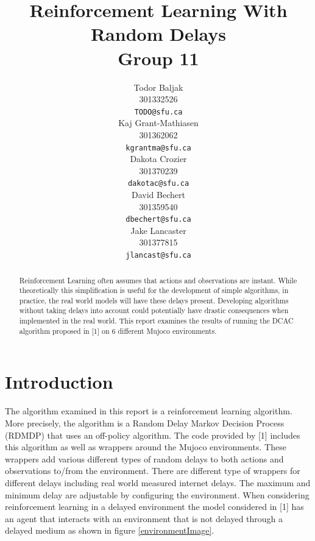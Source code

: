 \documentclass{article} %
\title{Reinforcement Learning With Random Delays\\Group 11}
\author{
   Todor Baljak\\
   301332526\\
   \texttt{TODO@sfu.ca}\\
\And
   Kaj Grant-Mathiasen\\
   301362062\\
   \texttt{kgrantma@sfu.ca}\\
\And
   Dakota Crozier\\
   301370239\\
   \texttt{dakotac@sfu.ca}\\
\AND
   David Bechert\\
   301359540\\
   \texttt{dbechert@sfu.ca}\\
\And
   Jake Lancaster\\
   301377815\\
   \texttt{jlancast@sfu.ca} \\
}
\begin{document}
\maketitle

\begin{abstract}
   Reinforcement Learning often assumes that actions and observations are instant. 
   While theoretically this simplification is useful for the development of simple 
   algorithms, in practice, the real world models will have these delays present. 
   Developing algorithms without taking delays into account could potentially have 
   drastic consequences when implemented in the real world. 
   This report examines the results of running the DCAC algorithm proposed in [1] on 
   6 different Mujoco environments.
\end{abstract}

\section{Introduction} \label{Introduction}

The algorithm examined in this report is a reinforcement learning algorithm.
More precisely, the algorithm is a Random Delay Markov Decision Process (RDMDP) that uses an 
off-policy algorithm. 
The code provided by [1] includes this algorithm as well as  wrappers around the Mujoco environments.
These wrappers add various different types of random delays to both actions and observations to/from 
the environment. 
There are different type of wrappers for different delays including real world measured 
internet delays. 
The maximum and minimum delay are adjustable by configuring the environment. 
When considering reinforcement learning in a delayed environment the model considered in [1]
has an agent that interacts with an environment that is not delayed through a delayed medium as shown in figure \ref{environmentImage}.
\end{document}

